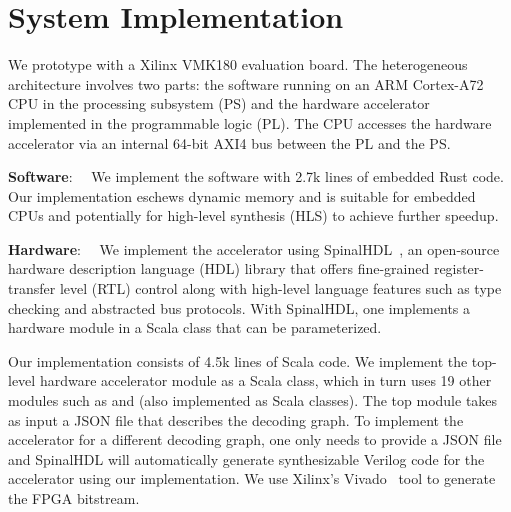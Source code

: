 \section{System Implementation}\label{sec:implementation}

We prototype \arch with a Xilinx VMK180 evaluation board.
The heterogeneous architecture involves two parts: the software running on an ARM Cortex-A72 CPU in the processing subsystem (PS) and the hardware accelerator implemented in the programmable logic (PL).
The CPU accesses the hardware accelerator via an internal 64-bit AXI4 bus between the PL and the PS.

\textbf{Software}:~~
We implement the software with 2.7k lines of embedded Rust code. Our implementation eschews dynamic memory and is suitable for embedded CPUs and potentially for high-level synthesis (HLS) to achieve further speedup.

\textbf{Hardware}:~~
We implement the accelerator using SpinalHDL~\cite{spinalhdlv193}, an open-source hardware description language (HDL) library that offers fine-grained register-transfer level (RTL) control along with high-level language features such as type checking and abstracted bus protocols.
With SpinalHDL, one implements a hardware module in a Scala class that can be parameterized. 

Our implementation consists of 4.5k lines of Scala code.
We implement the top-level hardware accelerator module as a Scala class, which in turn uses 19 other modules such as \puv and \pue (also implemented as Scala classes). 
The top module takes as input a JSON file that describes the decoding graph. To implement the accelerator for a different decoding graph, one only needs to provide a JSON file and SpinalHDL will automatically generate synthesizable Verilog code for the accelerator using our implementation. We use Xilinx's Vivado~\cite{vivado2023} tool to generate the FPGA bitstream.

